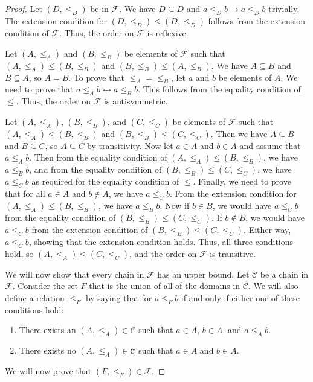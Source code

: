 \documentclass[../../math.tex]{subfiles}
\begin{document}
\begin{proof}
    Let $(D, \leq_D)$ be in $\mathcal F$.  We have $D \subseteq D$ and $a \leq_D
    b \to a \leq_D b$ trivially.  The extension condition for $(D, \leq_D) \leq
    (D, \leq_D)$ follows from the extension condition of $\mathcal F$.  Thus,
    the order on $\mathcal F$ is reflexive.

    Let $(A, \leq_A)$ and $(B, \leq_B)$ be elements of $\mathcal F$ such that
    $(A, \leq_A) \leq (B, \leq_B)$ and $(B, \leq_B) \leq (A, \leq_B)$.  We have
    $A \subseteq B$ and $B \subseteq A$, so $A = B$.  To prove that $\leq_A =
    \leq_B$, let $a$ and $b$ be elements of $A$.  We need to prove that $a
    \leq_A b \leftrightarrow a \leq_B b$.  This follows from the equality
    condition of $\leq$.  Thus, the order on $\mathcal F$ is antisymmetric.

    Let $(A, \leq_A)$, $(B, \leq_B)$, and $(C, \leq_C)$ be elements of $\mathcal
    F$ such that $(A, \leq_A) \leq (B, \leq_B)$ and $(B, \leq_B) \leq (C,
    \leq_C)$.  Then we have $A \subseteq B$ and $B \subseteq C$, so $A \subseteq
    C$ by transitivity.  Now let $a \in A$ and $b \in A$ and assume that $a
    \leq_A b$.  Then from the equality condition of $(A, \leq_A) \leq (B,
    \leq_B)$, we have $a \leq_B b$, and from the equality condition of $(B,
    \leq_B) \leq (C, \leq_C)$, we have $a \leq_C b$ as required for the equality
    condition of $\leq$.  Finally, we need to prove that for all $a \in A$ and
    $b \notin A$, we have $a \leq_C b$.  From the extension condition for $(A,
    \leq_A) \leq (B, \leq_B)$, we have $a \leq_B b$.  Now if $b \in B$, we would
    have $a \leq_C b$ from the equality condition of $(B, \leq_B) \leq (C,
    \leq_C)$.  If $b \notin B$, we would have $a \leq_C b$ from the extension
    condition of $(B, \leq_B) \leq (C, \leq_C)$.  Either way, $a \leq_C b$,
    showing that the extension condition holds.  Thus, all three conditions
    hold, so $(A, \leq_A) \leq (C, \leq_C)$, and the order on $\mathcal F$ is
    transitive.

    We will now show that every chain in $\mathcal F$ has an upper bound.  Let
    $\mathcal C$ be a chain in $\mathcal F$.  Consider the set $F$ that
    is the union of all of the domains in $\mathcal C$.  We will also define a
    relation $\leq_F$ by saying that for $a \leq_F b$ if and only if either one
    of these conditions hold:
    \begin{enumerate}
        \item There exists an $(A, \leq_A) \in \mathcal C$ such that $a \in A$,
        $b \in A$, and $a \leq_A b$.
        \item There exists no $(A, \leq_A) \in \mathcal C$ such that $a \in A$
        and $b \in A$.
    \end{enumerate}
    We will now prove that $(F, \leq_F) \in \mathcal F$.


\end{proof}
\end{document}
